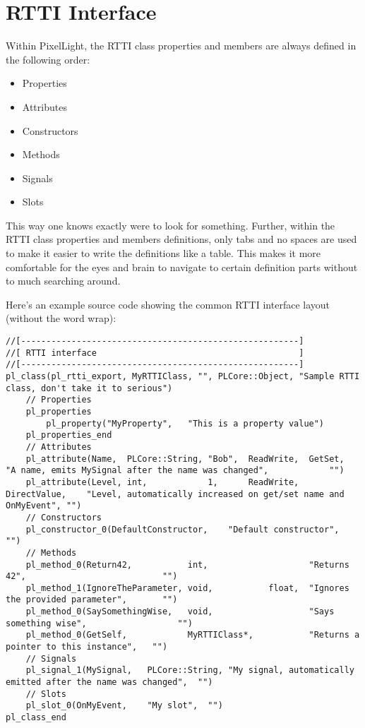 \section{\ac{RTTI} Interface}
Within PixelLight, the \ac{RTTI} class properties and members are always defined in the following order:
\begin{itemize}
\item Properties
\item Attributes
\item Constructors
\item Methods
\item Signals
\item Slots
\end{itemize}
This way one knows exactly were to look for something. Further, within the \ac{RTTI} class properties and members definitions, only tabs and no spaces are used to make it easier to write the definitions like a table. This makes it more comfortable for the eyes and brain to navigate to certain definition parts without to much searching around.

Here's an example source code showing the common \ac{RTTI} interface layout (without the word wrap):
\begin{lstlisting}[caption=\ac{RTTI} interface (without the word wrap)]
//[-------------------------------------------------------]
//[ RTTI interface                                        ]
//[-------------------------------------------------------]
pl_class(pl_rtti_export, MyRTTIClass, "", PLCore::Object, "Sample RTTI class, don't take it to serious")
	// Properties
	pl_properties
		pl_property("MyProperty",	"This is a property value")
	pl_properties_end
	// Attributes
	pl_attribute(Name,	PLCore::String,	"Bob",	ReadWrite,	GetSet,			"A name, emits MySignal after the name was changed",			"")
	pl_attribute(Level,	int,			1,		ReadWrite,	DirectValue,	"Level, automatically increased on get/set name and OnMyEvent",	"")
	// Constructors
	pl_constructor_0(DefaultConstructor,	"Default constructor",	"")
	// Methods
	pl_method_0(Return42,			int,					"Returns 42",							"")
	pl_method_1(IgnoreTheParameter,	void,			float,	"Ignores the provided parameter",		"")
	pl_method_0(SaySomethingWise,	void,					"Says something wise",					"")
	pl_method_0(GetSelf,			MyRTTIClass*,			"Returns a pointer to this instance",	"")
	// Signals
	pl_signal_1(MySignal,	PLCore::String,	"My signal, automatically emitted after the name was changed",	"")
	// Slots
	pl_slot_0(OnMyEvent,	"My slot",	"")
pl_class_end
\end{lstlisting}




